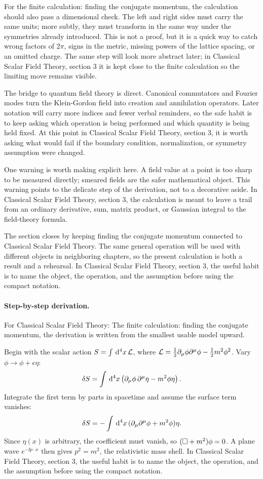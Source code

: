 For the finite calculation: finding the conjugate momentum, the calculation should also pass a dimensional check.  The left and right sides must carry the same units; more subtly, they must transform in the same way under the symmetries already introduced.  This is not a proof, but it is a quick way to catch wrong factors of \(2\pi\), signs in the metric, missing powers of the lattice spacing, or an omitted charge.  The same step will look more abstract later; in Classical Scalar Field Theory, section 3 it is kept close to the finite calculation so the limiting move remains visible.

The bridge to quantum field theory is direct.  Canonical commutators and Fourier modes turn the Klein-Gordon field into creation and annihilation operators.  Later notation will carry more indices and fewer verbal reminders, so the safe habit is to keep asking which operation is being performed and which quantity is being held fixed.  At this point in Classical Scalar Field Theory, section 3, it is worth asking what would fail if the boundary condition, normalization, or symmetry assumption were changed.

One warning is worth making explicit here.  A field value at a point is too sharp to be measured directly; smeared fields are the safer mathematical object.  This warning points to the delicate step of the derivation, not to a decorative aside.  In Classical Scalar Field Theory, section 3, the calculation is meant to leave a trail from an ordinary derivative, sum, matrix product, or Gaussian integral to the field-theory formula.

The section closes by keeping finding the conjugate momentum connected to Classical Scalar Field Theory.  The same general operation will be used with different objects in neighboring chapters, so the present calculation is both a result and a rehearsal.  In Classical Scalar Field Theory, section 3, the useful habit is to name the object, the operation, and the assumption before using the compact notation.



\paragraph{Step-by-step derivation.}

For Classical Scalar Field Theory: The finite calculation: finding the conjugate momentum, the derivation is written from the smallest usable model upward.

Begin with the scalar action \(S=\int\,\mathrm d^4x\,\mathcal L\), where \(\mathcal L=\frac12\partial_\mu\phi\partial^\mu\phi-\frac12m^2\phi^2\).  Vary \(\phi\to\phi+\epsilon\eta\):
\[
  \delta S=\int\,\mathrm d^4x\left(\partial_\mu\phi\,\partial^\mu\eta-m^2\phi\eta\right).
\]
Integrate the first term by parts in spacetime and assume the surface term vanishes:
\[
  \delta S=-\int\,\mathrm d^4x\,(\partial_\mu\partial^\mu\phi+m^2\phi)\eta.
\]
Since \(\eta(x)\) is arbitrary, the coefficient must vanish, so \((\Box+m^2)\phi=0\).  A plane wave \(e^{-\ii p\cdot x}\) then gives \(p^2=m^2\), the relativistic mass shell.  In Classical Scalar Field Theory, section 3, the useful habit is to name the object, the operation, and the assumption before using the compact notation.


